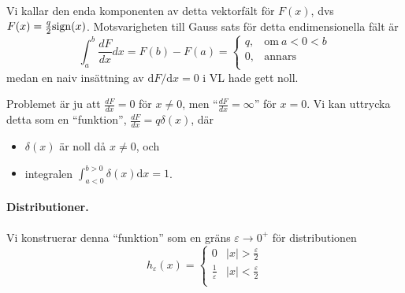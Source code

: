 \documentclass[%
oneside,                 %
final,                   %
10pt]{article}
\begin{document}
\vspace{6mm}



Vi kallar den enda komponenten av detta vektorfält för $F(x)$, dvs $F(x) = \frac{q}{2}\mathrm{sign}(x)$. Motsvarigheten till Gauss sats för detta endimensionella fält är 
\begin{equation}
\int_a^b \frac{dF}{dx} dx  = F(b) - F(a) = 
\left\{
\begin{array}{ll}
q, & \mathrm{om~} a < 0 < b \\ 
0, & \mathrm{annars} \\ 
\end{array}
\right.
\end{equation}
medan en naiv insättning av $\mbox{d}F / \mbox{d}x = 0$ i VL hade gett noll.

Problemet är ju att $\frac{dF}{dx} = 0$ för $x \neq 0$, men ``$\frac{dF}{dx} =  \infty$'' för $x = 0$. Vi kan uttrycka detta som en ``funktion'', $\frac{dF}{dx} = q \delta(x)$, där
\begin{itemize}
\item $\delta(x)$ är noll då $x \neq 0$, och

\item integralen $\int_{a<0}^{b>0} \delta(x) \mbox{d}x = 1$.
\end{itemize}

\noindent
\paragraph{Distributioner.}
Vi konstruerar denna ``funktion'' som en gräns $\varepsilon \to 0^+$ för distributionen
\begin{equation}
h_\varepsilon(x)
= \left\{
\begin{array}{ll}
0 & |x| > \frac{\varepsilon}{2} \\ 
\frac{1}{\varepsilon} & |x| < \frac{\varepsilon}{2} \\ 
\end{array}
\right.
\end{equation}



\vspace{6mm}
\end{document}
